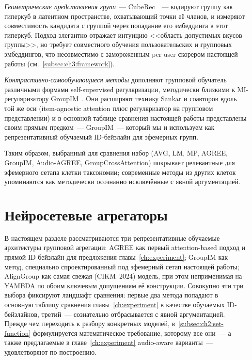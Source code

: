 \emph{Геометрические представления групп}~--- CubeRec~\cite{chen2022cuberec}~--- кодируют группу как гиперкуб в латентном пространстве, охватывающий точки её членов, и измеряют совместимость кандидата с группой через попадание его эмбеддинга в этот гиперкуб. Подход элегантно отражает интуицию <<область допустимых вкусов группы>>, но требует совместного обучения пользовательских и групповых эмбеддингов, что несовместимо с замороженным per-user скорером настоящей работы (см.~\ref{subsec:ch3:framework}).

\emph{Контрастивно-самообучающиеся методы} дополняют групповой обучатель различными формами self-supervised регуляризации, методически близкими к MI-регуляризатору GroupIM~\cite{sankar2020groupim}. Они расширяют технику Sankar и соавторов вдоль той же оси (item-agnostic attention плюс регуляризатор на групповом представлении) и в основной таблице сравнения настоящей работы представлены своим прямым предком~--- GroupIM~--- который мы и используем как репрезентативный обучаемый ID-бейзлайн для эфемерных групп.

Таким образом, выбранный для сравнения набор (AVG, LM, MP, AGREE, GroupIM, Audio-AGREE, GroupCrossAttention) покрывает релевантные для эфемерного сетапа клетки таксономии; современные методы из других клеток упоминаются как методически осознанно исключённые с явной аргументацией.

\section{Нейросетевые агрегаторы}
\label{sec:ch2:neural}

В настоящем разделе рассматриваются три репрезентативные обучаемые архитектуры групповой агрегации: AGREE как первый attention-based подход и прямой ID-бейзлайн для предложения главы~\ref{ch:experiment}; GroupIM как метод, специально спроектированный под эфемерный сетап настоящей работы; AlignGroup как самая свежая (CIKM~2024) модель, при этом неприменимая на YAMBDA по обоим ключевым допущениям её конструкции. Совокупно эти три выбора фиксируют ландшафт сравнения: первые два метода попадают в основную таблицу сравнения главы~\ref{ch:experiment} в качестве обучаемых ID-бейзлайнов, третий~--- сознательно отбрасывается с явной аргументацией. Прежде чем переходить к разбору конкретных моделей, в~\ref{subsec:ch2:set-function} формулируется математическое требование, которому все они~--- а также предлагаемые в главе~\ref{ch:experiment} audio-aware варианты~--- удовлетворяют по построению.

